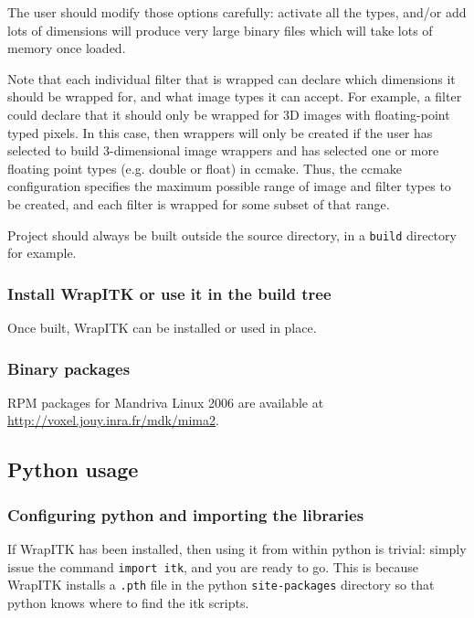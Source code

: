 \documentclass{InsightArticle}
\begin{document}
The user should modify those options carefully: activate all the types, and/or
add lots of dimensions will produce very large binary files which will take lots
of memory once loaded.

Note that each individual filter that is wrapped can declare which dimensions it
should be wrapped for, and what image types it can accept. For example, a filter
could declare that it should only be wrapped for 3D images with floating-point
typed pixels. In this case, then wrappers will only be created if the user has
selected to build 3-dimensional image wrappers and has selected one or more
floating point types (e.g. double or float) in ccmake. Thus, the ccmake
configuration specifies the maximum possible range of image and filter types to
be created, and each filter is wrapped for some subset of that range. 

Project should always be built outside the source directory, in a \verb$build$
directory for example.

    \subsubsection{Install WrapITK or use it in the build tree}

Once built, WrapITK can be installed or used in place.

    \subsubsection{Binary packages}

RPM packages for Mandriva Linux 2006 are available at \url{http://voxel.jouy.inra.fr/mdk/mima2}.


  \subsection{Python usage}

     \subsubsection{Configuring python and importing the libraries}

If WrapITK has been installed, then using it from within python is trivial:
simply issue the command \verb$import itk$, and you are ready to go. This
is because WrapITK installs a \verb$.pth$ file in the python \verb$site-packages$ directory so
that python knows where to find the itk scripts.
\end{document}
